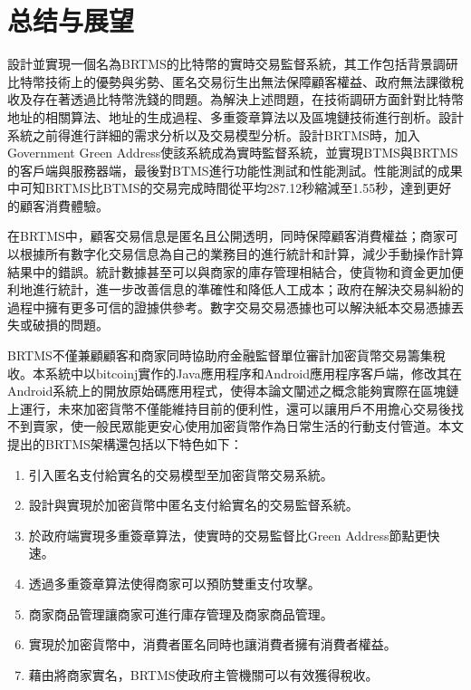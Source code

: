  
\chapter{总结与展望}
設計並實現一個名為BRTMS的比特幣的實時交易監督系統，其工作包括背景調研比特幣技術上的優勢與劣勢、匿名交易衍生出無法保障顧客權益、政府無法課徵稅收及存在著透過比特幣洗錢的問題。為解決上述問題，在技術調研方面針對比特幣地址的相關算法、地址的生成過程、多重簽章算法以及區塊鏈技術進行剖析。設計系統之前得進行詳細的需求分析以及交易模型分析。設計BRTMS時，加入Government Green Address使該系統成為實時監督系統，並實現BTMS與BRTMS的客戶端與服務器端，最後對BTMS進行功能性測試和性能測試。性能測試的成果中可知BRTMS比BTMS的交易完成時間從平均287.12秒縮減至1.55秒，達到更好的顧客消費體驗。

在BRTMS中，顧客交易信息是匿名且公開透明，同時保障顧客消費權益；商家可以根據所有數字化交易信息為自己的業務目的進行統計和計算，減少手動操作計算結果中的錯誤。統計數據甚至可以與商家的庫存管理相結合，使貨物和資金更加便利地進行統計，進一步改善信息的準確性和降低人工成本；政府在解決交易糾紛的過程中擁有更多可信的證據供參考。數字交易交易憑據也可以解決紙本交易憑據丟失或破損的問題。

BRTMS不僅兼顧顧客和商家同時協助府金融監督單位審計加密貨幣交易籌集稅收。本系統中以bitcoinj實作的Java應用程序和Android應用程序客戶端，修改其在Android系統上的開放原始碼應用程式，使得本論文闡述之概念能夠實際在區塊鏈上運行，未來加密貨幣不僅能維持目前的便利性，還可以讓用戶不用擔心交易後找不到賣家，使一般民眾能更安心使用加密貨幣作為日常生活的行動支付管道。本文提出的BRTMS架構還包括以下特色如下：

		\begin{enumerate}
			\item 引入匿名支付給實名的交易模型至加密貨幣交易系統。
			\item 設計與實現於加密貨幣中匿名支付給實名的交易監督系統。
			\item 於政府端實現多重簽章算法，使實時的交易監督比Green Address節點更快速。
			\item 透過多重簽章算法使得商家可以預防雙重支付攻擊。
			\item 商家商品管理讓商家可進行庫存管理及商家商品管理。
			\item 實現於加密貨幣中，消費者匿名同時也讓消費者擁有消費者權益。
			\item 藉由將商家實名，BRTMS使政府主管機關可以有效獲得稅收。
		\end{enumerate}

